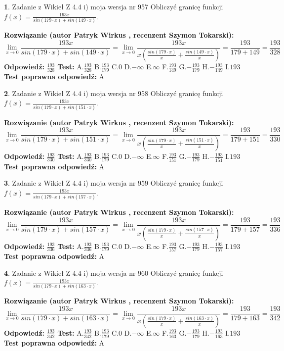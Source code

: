 \documentclass[12pt, a4paper]{article}
\theoremstyle{definition} %
\newtheorem{zad}{}
\newcommand{\zadStart}[1]{\begin{zad}#1\newline}
\newcommand{\zadStop}{\end{zad}}
\newcommand{\rozwStart}[2]{\noindent \textbf{Rozwiązanie (autor #1 , recenzent #2): }\newline}
\newcommand{\rozwStop}{\newline}
\newcommand{\odpStart}{\noindent \textbf{Odpowiedź:}\newline}
\newcommand{\odpStop}{\newline}
\newcommand{\testStart}{\noindent \textbf{Test:}\newline}
\newcommand{\testStop}{\newline}
\newcommand{\kluczStart}{\noindent \textbf{Test poprawna odpowiedź:}\newline}
\newcommand{\kluczStop}{\newline}
\begin{document}
\zadStart{Zadanie z Wikieł Z 4.4 i) moja wersja nr 957}
Obliczyć granicę funkcji $f(x)=\frac{193x}{sin(179\cdot x) +sin(149\cdot x)}$.
\zadStop
\rozwStart{Patryk Wirkus}{Szymon Tokarski}
$$\lim\limits_{x\to 0}\frac{193x}{sin(179\cdot x) +sin(149\cdot x)}=\lim\limits_{x\to 0}\frac{193x}{x(\frac{sin(179\cdot x)}{x}+\frac{sin(149\cdot x)}{x})}=\frac{193}{179+149} = \frac{193}{328}$$
\rozwStop
\odpStart
$\frac{193}{328}$
\odpStop
\testStart
A.$\frac{193}{328}$
B.$\frac{193}{179}$
C.$0$
D.$-\infty$
E.$\infty$
F.$\frac{193}{149}$
G.$-\frac{193}{179}$
H.$-\frac{193}{149}$
I.$193$
\testStop
\kluczStart
A
\kluczStop



\zadStart{Zadanie z Wikieł Z 4.4 i) moja wersja nr 958}
Obliczyć granicę funkcji $f(x)=\frac{193x}{sin(179\cdot x) +sin(151\cdot x)}$.
\zadStop
\rozwStart{Patryk Wirkus}{Szymon Tokarski}
$$\lim\limits_{x\to 0}\frac{193x}{sin(179\cdot x) +sin(151\cdot x)}=\lim\limits_{x\to 0}\frac{193x}{x(\frac{sin(179\cdot x)}{x}+\frac{sin(151\cdot x)}{x})}=\frac{193}{179+151} = \frac{193}{330}$$
\rozwStop
\odpStart
$\frac{193}{330}$
\odpStop
\testStart
A.$\frac{193}{330}$
B.$\frac{193}{179}$
C.$0$
D.$-\infty$
E.$\infty$
F.$\frac{193}{151}$
G.$-\frac{193}{179}$
H.$-\frac{193}{151}$
I.$193$
\testStop
\kluczStart
A
\kluczStop



\zadStart{Zadanie z Wikieł Z 4.4 i) moja wersja nr 959}
Obliczyć granicę funkcji $f(x)=\frac{193x}{sin(179\cdot x) +sin(157\cdot x)}$.
\zadStop
\rozwStart{Patryk Wirkus}{Szymon Tokarski}
$$\lim\limits_{x\to 0}\frac{193x}{sin(179\cdot x) +sin(157\cdot x)}=\lim\limits_{x\to 0}\frac{193x}{x(\frac{sin(179\cdot x)}{x}+\frac{sin(157\cdot x)}{x})}=\frac{193}{179+157} = \frac{193}{336}$$
\rozwStop
\odpStart
$\frac{193}{336}$
\odpStop
\testStart
A.$\frac{193}{336}$
B.$\frac{193}{179}$
C.$0$
D.$-\infty$
E.$\infty$
F.$\frac{193}{157}$
G.$-\frac{193}{179}$
H.$-\frac{193}{157}$
I.$193$
\testStop
\kluczStart
A
\kluczStop



\zadStart{Zadanie z Wikieł Z 4.4 i) moja wersja nr 960}
Obliczyć granicę funkcji $f(x)=\frac{193x}{sin(179\cdot x) +sin(163\cdot x)}$.
\zadStop
\rozwStart{Patryk Wirkus}{Szymon Tokarski}
$$\lim\limits_{x\to 0}\frac{193x}{sin(179\cdot x) +sin(163\cdot x)}=\lim\limits_{x\to 0}\frac{193x}{x(\frac{sin(179\cdot x)}{x}+\frac{sin(163\cdot x)}{x})}=\frac{193}{179+163} = \frac{193}{342}$$
\rozwStop
\odpStart
$\frac{193}{342}$
\odpStop
\testStart
A.$\frac{193}{342}$
B.$\frac{193}{179}$
C.$0$
D.$-\infty$
E.$\infty$
F.$\frac{193}{163}$
G.$-\frac{193}{179}$
H.$-\frac{193}{163}$
I.$193$
\testStop
\kluczStart
A
\kluczStop
\end{document}
